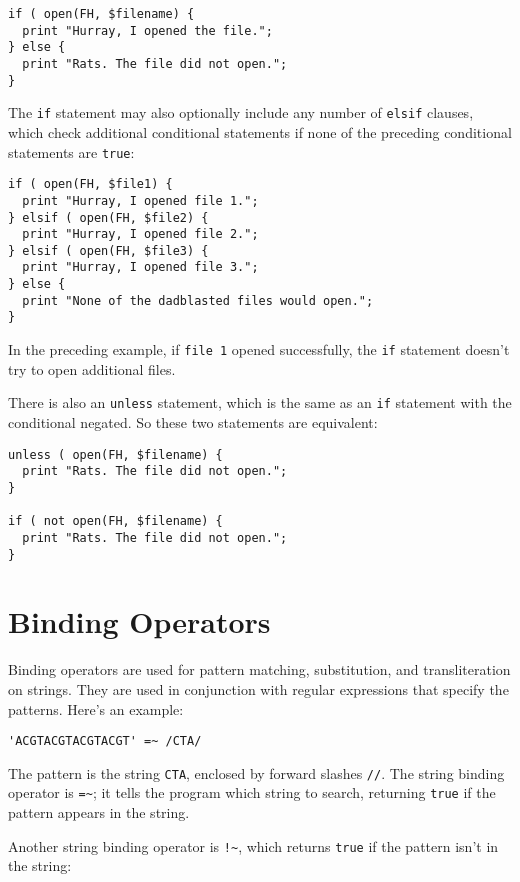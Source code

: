 \begin{lstlisting}
if ( open(FH, $filename) {
  print "Hurray, I opened the file.";
} else {
  print "Rats. The file did not open.";
}
\end{lstlisting}

The \verb|if| statement may also optionally include any number of \verb|elsif| clauses, which check additional conditional statements if none of the preceding conditional statements are \verb|true|: 

\begin{lstlisting}
if ( open(FH, $file1) {
  print "Hurray, I opened file 1.";
} elsif ( open(FH, $file2) {
  print "Hurray, I opened file 2.";
} elsif ( open(FH, $file3) {
  print "Hurray, I opened file 3.";
} else {
  print "None of the dadblasted files would open.";
}
\end{lstlisting}

In the preceding example, if \verb|file 1| opened successfully, the \verb|if| statement doesn't try to open additional files.

There is also an \verb|unless| statement, which is the same as an \verb|if| statement with the conditional negated. So these two statements are equivalent:

\begin{lstlisting}
unless ( open(FH, $filename) {
  print "Rats. The file did not open.";
}

if ( not open(FH, $filename) {
  print "Rats. The file did not open.";
}
\end{lstlisting}

\section{Binding Operators}
Binding operators are used for pattern matching, substitution, and transliteration on strings. They are used in conjunction with regular expressions that specify the patterns. Here's an example: 

\begin{lstlisting}
'ACGTACGTACGTACGT' =~ /CTA/
\end{lstlisting}

The pattern is the string \verb|CTA|, enclosed by forward slashes \verb|//|. The string binding operator is \verb|=~|; it tells the program which string to search, returning \verb|true| if the pattern appears in the string.  

Another string binding operator is \verb|!~|, which returns \verb|true| if the pattern isn't in the string:

